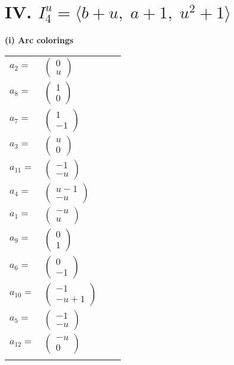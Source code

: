 \documentclass[1p]{elsarticle_modified}
\theoremstyle{definition}
\begin{document}
\centering \section*{IV. $I^u_{4}= \langle b+u,\;a+1,\;u^2+1 \rangle$}
\flushleft \textbf{(i) Arc colorings}\\
\begin{tabular}{m{7pt} m{180pt} m{7pt} m{180pt} }
\flushright $a_{2}=$&$\begin{pmatrix}0\\u\end{pmatrix}$ \\
\flushright $a_{8}=$&$\begin{pmatrix}1\\0\end{pmatrix}$ \\
\flushright $a_{7}=$&$\begin{pmatrix}1\\-1\end{pmatrix}$ \\
\flushright $a_{3}=$&$\begin{pmatrix}u\\0\end{pmatrix}$ \\
\flushright $a_{11}=$&$\begin{pmatrix}-1\\- u\end{pmatrix}$ \\
\flushright $a_{4}=$&$\begin{pmatrix}u-1\\- u\end{pmatrix}$ \\
\flushright $a_{1}=$&$\begin{pmatrix}- u\\u\end{pmatrix}$ \\
\flushright $a_{9}=$&$\begin{pmatrix}0\\1\end{pmatrix}$ \\
\flushright $a_{6}=$&$\begin{pmatrix}0\\-1\end{pmatrix}$ \\
\flushright $a_{10}=$&$\begin{pmatrix}-1\\- u+1\end{pmatrix}$ \\
\flushright $a_{5}=$&$\begin{pmatrix}-1\\- u\end{pmatrix}$ \\
\flushright $a_{12}=$&$\begin{pmatrix}- u\\0\end{pmatrix}$\\&\end{tabular}
\end{document}
